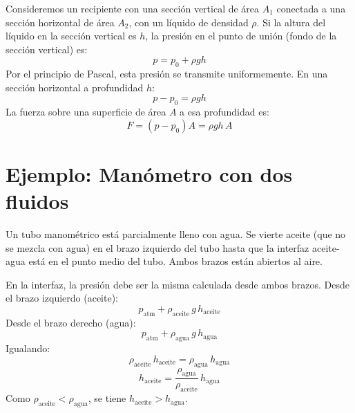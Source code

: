 Consideremos un recipiente con una sección vertical de área $A_1$ conectada a una sección horizontal de área $A_2$, con un líquido de densidad $\rho$. Si la altura del líquido en la sección vertical es $h$, la presión en el punto de unión (fondo de la sección vertical) es:
\begin{equation}
    p = p_0 + \rho g h
\end{equation}
Por el principio de Pascal, esta presión se transmite uniformemente. En una sección horizontal a profundidad $h$:
\begin{equation}
    p - p_0 = \rho g h
\end{equation}
La fuerza sobre una superficie de área $A$ a esa profundidad es:
\begin{equation}
    F = (p - p_0)A = \rho g h\, A
\end{equation}

\section{Ejemplo: Manómetro con dos fluidos}

Un tubo manométrico está parcialmente lleno con agua. Se vierte aceite (que no se mezcla con agua) en el brazo izquierdo del tubo hasta que la interfaz aceite-agua está en el punto medio del tubo. Ambos brazos están abiertos al aire.

En la interfaz, la presión debe ser la misma calculada desde ambos brazos. Desde el brazo izquierdo (aceite):
\begin{equation}
    p_{\text{atm}} + \rho_{\text{aceite}}\,g\,h_{\text{aceite}}
\end{equation}
Desde el brazo derecho (agua):
\begin{equation}
    p_{\text{atm}} + \rho_{\text{agua}}\,g\,h_{\text{agua}}
\end{equation}
Igualando:
\begin{equation}
    \rho_{\text{aceite}}\,h_{\text{aceite}} = \rho_{\text{agua}}\,h_{\text{agua}}
\end{equation}
\begin{equation}
    h_{\text{aceite}} = \frac{\rho_{\text{agua}}}{\rho_{\text{aceite}}}\,h_{\text{agua}}
\end{equation}
Como $\rho_{\text{aceite}} < \rho_{\text{agua}}$, se tiene $h_{\text{aceite}} > h_{\text{agua}}$.

